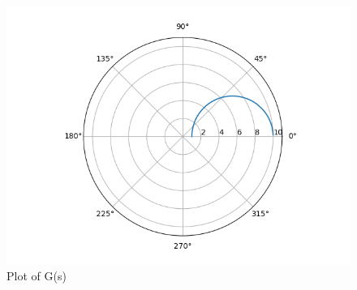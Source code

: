 \begin{enumerate}[label=\thesection.\arabic*.,ref=\thesection.\theenumi]
\begin{frame}
\begin{center}
      \begin{figure}[!h]
      \centering
      \includegraphics[width=\columnwidth]{./figs/ee18btech11051_figure1.png}
      \caption{Plot of G(s)}
      \label{fig:ee18btech11051_fig2}
      \end{figure}
\end{center}

\end{frame}

\end{enumerate}
